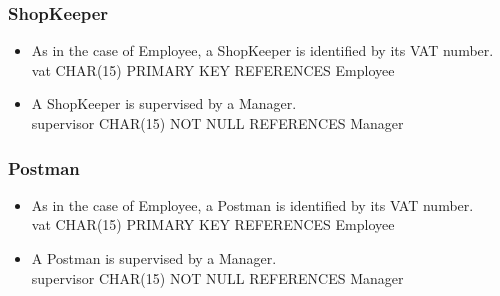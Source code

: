 \documentclass{report}[a4paper]
\theoremstyle{remark}
\begin{document}
\subsubsection{ShopKeeper}
\begin{itemize}
    \item As in the case of Employee, a ShopKeeper is identified by its VAT number. \\ vat CHAR(15) PRIMARY KEY REFERENCES Employee
    \item A ShopKeeper is supervised by a Manager. \\ supervisor CHAR(15) NOT NULL REFERENCES Manager
\end{itemize}
\subsubsection{Postman}
\begin{itemize}
    \item As in the case of Employee, a Postman is identified by its VAT number. \\ vat CHAR(15) PRIMARY KEY REFERENCES Employee
    \item A Postman is supervised by a Manager. \\ supervisor CHAR(15) NOT NULL REFERENCES Manager
\end{itemize}
\end{document}
